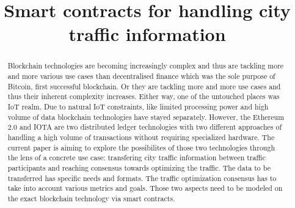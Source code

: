 \documentclass[conference]{IEEEtran}
\begin{document}
\title{Smart contracts for handling city traffic information}

\author{
    \and
}

\maketitle

\begin{abstract}

    Blockchain technologies are becoming increasingly complex and thus are tackling more and more various use cases than decentralised finance which was the sole purpose of Bitcoin, first successful blockchain. Or they are tackling more and more use cases and thus their inherent complexity increases. Either way, one of the untouched places was IoT realm. Due to natural IoT constraints, like limited processing power and high volume of data blockchain technologies have stayed separately. However, the Ethereum 2.0 and IOTA are two distributed ledger technologies with two different approaches of handling a high volume of transactions without requiring specialized hardware. The current paper is aiming to explore the possibilites of those two technologies through the lens of a concrete use case: transfering city traffic information between traffic participants and reaching consensus towards optimizing the traffic. The data to be transferred has specific needs and formats. The traffic optimization consensus has to take into account various metrics and goals. Those two aspects need to be modeled on the exact blockchain technology via smart contracts.

\end{abstract}

\begin{IEEEkeywords}
    
\end{IEEEkeywords}
\end{document}
